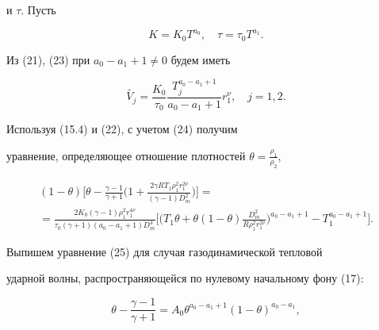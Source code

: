 и $\tau$. Пусть


\begin{equation}


K=K_{0}T^{a_{0}},\quad \tau = \tau


_{0}T^{a_{1}}.


\end{equation}


Из (21), (23) при $a_{0}-a_{1}+1 \neq 0$ будем иметь


\begin{equation}


\widetilde{V_{j}} = \frac {K_{0}}{\tau _{0}} \frac {T_{j} ^{a_{0} -


a_{1}+1}} {a_{0} - a_{1}+1}r_{1}^{\nu},\quad j=1,2.


\end{equation}


Используя (15.4) и (22), с учетом (24) получим


уравнение, определяющее отношение плотностей $\theta = \frac


{\rho_{1}}{\rho_{2}}$,


\begin{multline}


(1- \theta)\bigg[\theta - \frac {\gamma - 1}{\gamma +


1}\bigg(1+ \frac {2 \gamma R T_{1}


\rho _{1} ^{2} r_1 ^{2 \nu}}{(\gamma - 1) D _{m} ^{2}}\bigg)\bigg] =\\


= \frac {2 K_{0} (\gamma - 1) \rho _{1} ^{2} r_1 ^{4 \nu}}


{\tau _{0} (\gamma +1)(a_0 -


a_1 +1) D_{m} ^4}\bigg[\bigg(T_{1} \theta + \theta(1-\theta)\frac


{D_{m} ^{2}}{R \rho _{1} ^{2} r ^{2 \nu} _1}\bigg)^{a_0 - a_1 + 1} -


T_1 ^{a_0 - a_1 + 1}\bigg].


\end{multline}





Выпишем уравнение (25) для случая газодинамической тепловой


ударной волны, распространяющейся по нулевому начальному фону (17):


\begin{equation}


\theta - \frac {\gamma - 1} {\gamma+1} = A_{0}


\theta ^{a_0 - a_1 +1} (1 - \theta)^{a_0 - a_1},


\end{equation}


